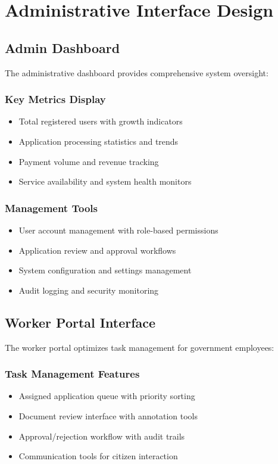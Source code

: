 \documentclass[12pt,a4paper]{article}
\begin{document}
\section{Administrative Interface Design}

\subsection{Admin Dashboard}

The administrative dashboard provides comprehensive system oversight:

\subsubsection{Key Metrics Display}
\begin{itemize}
    \item Total registered users with growth indicators
    \item Application processing statistics and trends
    \item Payment volume and revenue tracking
    \item Service availability and system health monitors
\end{itemize}

\subsubsection{Management Tools}
\begin{itemize}
    \item User account management with role-based permissions
    \item Application review and approval workflows
    \item System configuration and settings management
    \item Audit logging and security monitoring
\end{itemize}

\subsection{Worker Portal Interface}

The worker portal optimizes task management for government employees:

\subsubsection{Task Management Features}
\begin{itemize}
    \item Assigned application queue with priority sorting
    \item Document review interface with annotation tools
    \item Approval/rejection workflow with audit trails
    \item Communication tools for citizen interaction
\end{itemize}
\end{document}
